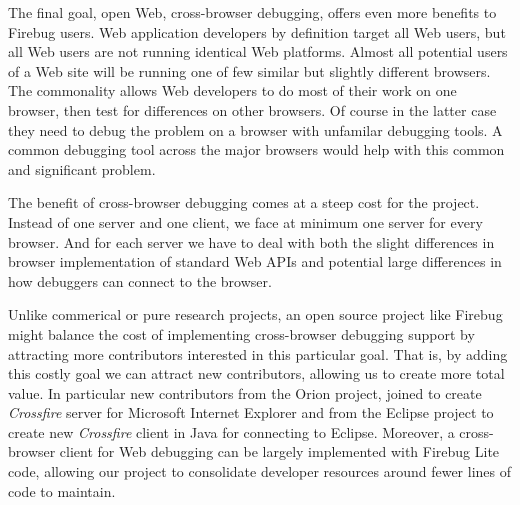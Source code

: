 The final goal, open Web, cross-browser debugging, offers even more benefits to
Firebug users.  Web application developers by definition target all Web users,
but all Web users are not running identical Web platforms. Almost all
potential users of a Web site will be running one of few similar but slightly
different browsers. The commonality allows Web developers to do most of their
work on one browser, then test for differences on other browsers. Of course in
the latter case they need to debug the problem on a browser with unfamilar debugging
tools. A common debugging tool across the major browsers would help with this
common and significant problem.

The benefit of cross-browser debugging comes at a steep cost for the project.
Instead of one server and one client, we face at minimum one server for every
browser. And for each server we have to deal with both the slight differences in
browser implementation of standard Web APIs and potential large differences in
how debuggers can connect to the browser.

Unlike commerical or pure research projects, an open source project like Firebug
might balance the cost of
implementing cross-browser debugging support by attracting more contributors
interested in this particular goal. That is, by adding this costly goal we can
attract new contributors, allowing us to create more total value. In particular
new contributors from the Orion project\cite{orion}, joined to create
\textit{Crossfire} server for Microsoft Internet Explorer and from the Eclipse
project\cite{EclipseJSDT} to create new \textit{Crossfire} client in Java for
connecting to Eclipse.   Moreover, a cross-browser client for Web debugging can be largely
implemented with Firebug Lite code, allowing our project to consolidate
developer resources around fewer lines of code to maintain.

